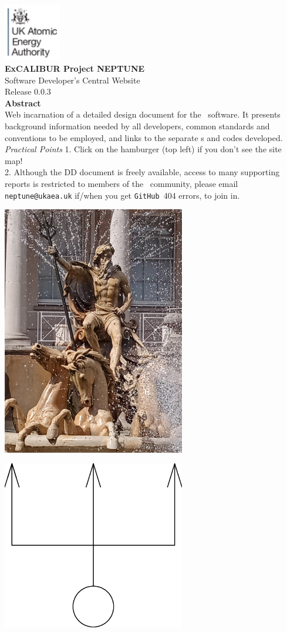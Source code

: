 \documentclass[11pt,twoside,a4paper]{report}
\newcommand{\culhamtitle}{\LARGE Software Developer's Central Website  \\[1.0\baselineskip] Release 0.0.3}%
\begin{document}
\vspace*{-30mm}
\includegraphics[width=2.5cm]{./corpics/cofaplus.png} \\[2.0\baselineskip]
{\LARGE {\textbf{\textsf{ExCALIBUR Project NEPTUNE}}}\\[2.0\baselineskip]}
{\LARGE \culhamtitle } \\[2.0\baselineskip]
{\textbf{\textsf{Abstract}}}\\
Web incarnation of a detailed design document for the \nep \ software.
It presents background information needed by all developers, common
standards and conventions to be employed, and links to the separate
\papp s and codes developed.\\
\emph{Practical Points}
1. Click on the hamburger (top left) if you don't see the site map! \\
2. Although the DD document is freely available,
access to many supporting reports is restricted to members of the \nep \
community, please email {\tt neptune@ukaea.uk} if/when you get
{\tt GitHub}~404 errors, to join in.
\vfill
\centerline{\includegraphics[width=8cm]{./png/neptune.png}}
\centerline{\includegraphics[width=8cm]{./png/trident.png}}
\tableofcontents
\clearpage

\clearpage
\end{document}
